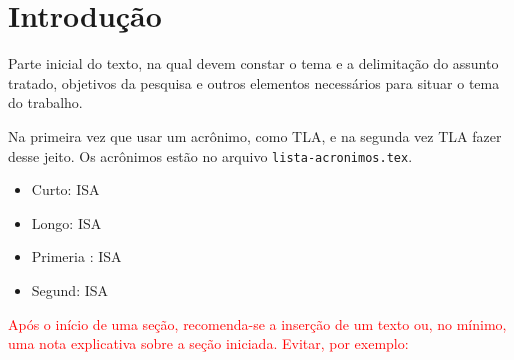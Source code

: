 
\chapter{Introdução}\label{cap:introducao}

Parte inicial do texto, na qual devem constar o tema e a delimitação do assunto tratado, objetivos da pesquisa e outros elementos necessários para situar o tema do trabalho. 

Na primeira vez que usar um acrônimo, como \ac{TLA},  e na segunda vez \ac{TLA} fazer desse jeito. Os acrônimos estão no arquivo \verb|lista-acronimos.tex|. 


\begin{itemize}
    \item Curto: \acs{ISA}
    \item Longo: \acl{ISA}
    \item Primeria : \ac{ISA}
    \item Segund: \ac{ISA}
\end{itemize}

\textcolor{red}{Após o início de uma seção, recomenda-se a inserção de um texto ou, no mínimo, uma nota explicativa sobre a seção iniciada. Evitar, por exemplo:}










